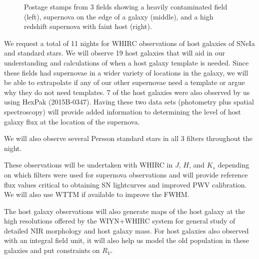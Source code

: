 \documentclass[11pt]{article}
\begin{document}
\clearpage

\begin{figure}
\caption{Postage stamps from 3 fields showing a heavily contaminated field (left), supernova on the edge of a galaxy (middle), and a high redshift supernova with faint host (right).}
\end{figure}


\clearpage


%

%

\expdesign

We request a total of 11 nights for WHIRC observations of host galaxies of SNeIa and standard stars.  
We will observe 19 host galaxies that will aid in our understanding and calculations of when a host galaxy template is needed. 
Since these fields had supernovae in a wider variety of locations in the galaxy, we will be able to extrapolate if any of our other supernovae need a template or argue why they do not need templates. 
7 of the host galaxies were also observed by us using HexPak (2015B-0347). 
Having these two data sets (photometry plus spatial spectroscopy) will provide added information to determining the level of host galaxy flux at the location of the supernova. 

We will also observe several Persson standard stars in all 3 filters throughout the night.

These observations will be undertaken with WHIRC in $J$, $H$, and $K_s$ depending on which filters were used for supernova observations
and will provide reference flux values critical to obtaining
SN lightcurves and improved PWV calibration.  
We will also use WTTM if available to improve the FWHM.

The host galaxy observations will also generate
maps of the host galaxy at the high resolutions offered by the WIYN+WHIRC system for general study of detailed NIR morphology and host galaxy mass.
For host galaxies also observed with an integral field unit, it will also help us model the old population in these galaxies and put constraints on $R_V$. 
\end{document}
